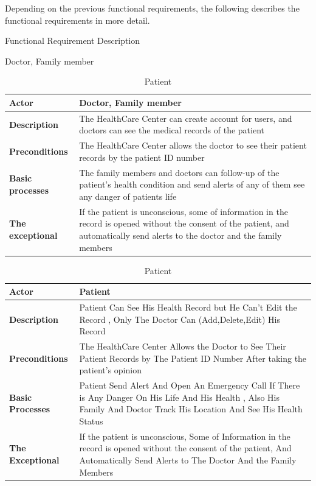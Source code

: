 \documentclass[12pt]{article}
\begin{document}
			\quad Depending on the previous functional requirements, the following describes the functional requirements in more detail.
			\begin{table}[!h]
				\centering
				\caption{Functional Requirement Description}
				\begin{subtable}{\textwidth}
					\centering
					\caption{Doctor, Family member}
					\begin{tabular}{|l|p{10cm}|}
						\hline
						\rowcolor{lightgray}
						\textbf{Actor} & \textbf{Doctor, Family member} \\
						\hline
						\textbf{Description} & The HealthCare Center can create account for users, and doctors can see the medical records of the patient \\
						\hline
						\textbf{Preconditions} & The HealthCare Center allows the doctor to see their patient records by the patient ID number \\
						\hline
						\textbf{Basic processes} & The family members and doctors can follow-up of the patient's health condition and send alerts of any of them see any danger of patients life \\
						\hline
						\textbf{The exceptional} & If the patient is unconscious, some of information in the record is opened without the consent of the patient, and automatically send alerts to the doctor and the family members \\
						\hline
					\end{tabular}
				\end{subtable}
				\begin{center}
				\end{center}
				\begin{subtable}{\textwidth}
					\centering
					\caption{Patient}
					\begin{tabular}{|l|p{10cm}|}
						\hline
						\rowcolor{lightgray}
						\textbf{Actor} & \textbf{Patient} \\
						\hline
						\textbf{Description} & Patient Can See His Health Record but He Can't Edit the Record , Only The Doctor Can (Add,Delete,Edit) His Record \\
						\hline
						\textbf{Preconditions} & The HealthCare Center Allows the Doctor to See Their Patient Records by The Patient ID Number After taking the patient's opinion \\
						\hline
						\textbf{Basic Processes} & Patient Send Alert And Open An Emergency Call If There is Any Danger On His Life And His Health , Also His Family And Doctor Track His Location And See His Health Status \\
						\hline
						\textbf{The Exceptional} & If the patient is unconscious, Some of Information in the record is opened without the consent of the patient, And Automatically Send Alerts to The Doctor And the Family Members \\
						\hline
					\end{tabular}
				\end{subtable}
			\end{table}
		\newpage
		
\end{document}
